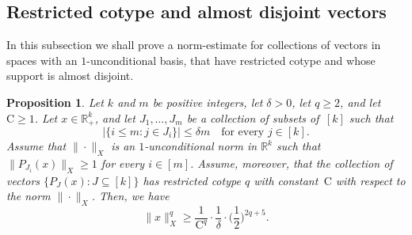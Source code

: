 \documentclass[11pt,leqno]{amsart}
\newtheorem{proposition}[theorem]{Proposition}
\theoremstyle{remark}
\theoremstyle{plain}
\newcommand{\R}{\mathbb{R}}
\begin{document}
\subsection{Restricted cotype and almost disjoint vectors}

In this subsection we shall prove a norm-estimate for collections of vectors in spaces with an $1\text{-unconditional}$
basis, that have restricted cotype and whose support is almost disjoint.
\begin{proposition}%
\label{aljfhbsjfhbskajhsb}
Let $k$ and $m$ be positive integers, let $\delta>0$, let $q\geqslant 2$, and let\, $\mathrm{C}\geqslant 1$.
Let $x\in\R_+^k$, and let $J_1,\dots,J_m$ be a collection of subsets of\, $[k]$ such that
\begin{equation} \label{ajfgaifgvweufygvuhgv}
\big|\big\{i\leqslant m\colon j\in J_i\big\}\big|\leqslant \delta m \ \ \ \text{ for every } j\in [k].
\end{equation}
Assume that $\|\cdot\|_X$ is an $1$-unconditional norm in $\R^k$ such that $\|P_{J_i}(x)\|_X\geqslant 1$
for every $i\in [m]$. Assume, moreover, that the collection of vectors $\big\{P_J(x)\colon J\subseteq [k]\big\}$
has restricted cotype $q$ with constant\, $\mathrm{C}$ with respect to the norm $\|\cdot\|_X$. Then, we have
\begin{equation} \label{eq-new3}
\|x\|_X^q\geqslant \frac{1}{\mathrm{C}^{q}}\cdot \frac{1}{\delta} \cdot \Big(\frac{1}{2}\Big)^{2q+5}.
\end{equation}
\end{proposition}
\end{document}
